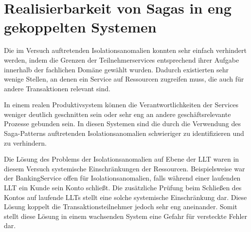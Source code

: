 \section{Realisierbarkeit von Sagas in eng gekoppelten Systemen}
Die im Versuch auftretenden Isolationsanomalien konnten sehr einfach verhindert werden, indem die Grenzen der Teilnehmerservices entsprechend ihrer Aufgabe innerhalb der fachlichen Domäne gewählt wurden. Dadurch existierten sehr wenige Stellen, an denen ein Service auf Ressourcen zugreifen muss, die auch für andere Transaktionen relevant sind. 

In einem realen Produktivsystem können die Verantwortlichkeiten der Services weniger deutlich geschnitten sein oder sehr eng an andere geschäftsrelevante Prozesse gebunden sein. In diesen Systemen sind die durch die Verwendung des Saga-Patterns auftretenden Isolationsanomalien schwieriger zu identifizieren und zu verhindern. 

Die Lösung des Problems der Isolationsanomalien auf Ebene der LLT waren in diesem Versuch systemische Einschränkungen der Ressourcen. Beispielsweise war der BankingService offen für Isolationsanomalien, falls während einer laufenden LLT ein Kunde sein Konto schließt. Die zusätzliche Prüfung beim Schließen des Kontos auf laufende LLTs stellt eine solche systemische Einschränkung dar. Diese Lösung koppelt die Transaktionsteilnehmer jedoch sehr eng aneinander. Somit stellt diese Lösung in einem wachsenden System eine Gefahr für versteckte Fehler dar. 